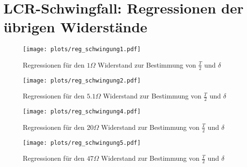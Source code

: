 \documentclass[a4paper, 12pt]{scrartcl}
\begin{document}
\section{LCR-Schwingfall: Regressionen der übrigen Widerstände}\label{app:reg}
\begin{figure}[H]
\centering
\texttt{[image: plots/reg\_schwingung1.pdf]}
\caption{Regressionen für den $1\Omega$ Widerstand zur Bestimmung von $\frac{T}{2}$ und $\delta$}
\end{figure}
\begin{figure}[H]
\centering
\texttt{[image: plots/reg\_schwingung2.pdf]}
\caption{Regressionen für den $5.1\Omega$ Widerstand zur Bestimmung von $\frac{T}{2}$ und $\delta$}
\end{figure}
\begin{figure}[H]
\centering
\texttt{[image: plots/reg\_schwingung4.pdf]}
\caption{Regressionen für den $20\Omega$ Widerstand zur Bestimmung von $\frac{T}{2}$ und $\delta$}
\end{figure}
\begin{figure}[H]
\centering
\texttt{[image: plots/reg\_schwingung5.pdf]}
\caption{Regressionen für den $47\Omega$ Widerstand zur Bestimmung von $\frac{T}{2}$ und $\delta$}
\end{figure}
\end{document}

